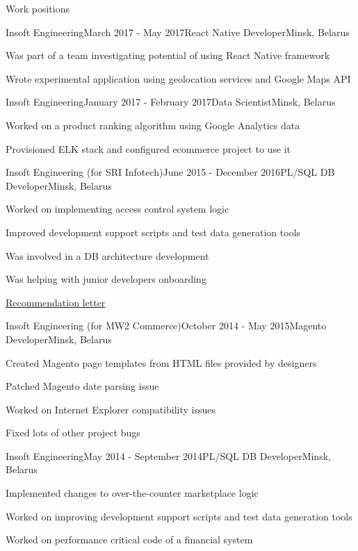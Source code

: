 \documentclass{resume} %
\begin{document}
\begin{rSection}{Work positions}
\begin{rSubsection}{Insoft Engineering}{March 2017 - May 2017}{React Native Developer}{Minsk, Belarus}
\item Was part of a team investigating potential of using React Native framework
\item Wrote experimental application using geolocation services and Google Maps API
\end{rSubsection}

\begin{rSubsection}{Insoft Engineering}{January 2017 - February 2017}{Data Scientist}{Minsk, Belarus}
\item Worked on a product ranking algorithm using Google Analytics data
\item Provisioned ELK stack and configured ecommerce project to use it
\end{rSubsection}

\begin{rSubsection}{Insoft Engineering (for SRI Infotech)}{June 2015 - December 2016}{PL/SQL DB Developer}{Minsk, Belarus}
\item Worked on implementing access control system logic
\item Improved development support scripts and test data generation tools
\item Was involved in a DB architecture development
\item Was helping with junior developers onboarding
\item \href{https://drive.google.com/file/d/0B256DYrZGsaVZHZJb3FMQ01hVHM/view}{Recommendation letter}
\end{rSubsection}

\begin{rSubsection}{Insoft Engineering (for MW2 Commerce)}{October 2014 - May 2015}{Magento Developer}{Minsk, Belarus}
\item Created Magento page templates from HTML files provided by designers
\item Patched Magento date parsing issue
\item Worked on Internet Explorer compatibility issues
\item Fixed lots of other project bugs
\end{rSubsection}

\begin{rSubsection}{Insoft Engineering}{May 2014 - September 2014}{PL/SQL DB Developer}{Minsk, Belarus}
\item Implemented changes to over-the-counter marketplace logic
\item Worked on improving development support scripts and test data generation tools
\item Worked on performance critical code of a financial system
\end{rSubsection}

\end{rSection}
\end{document}
